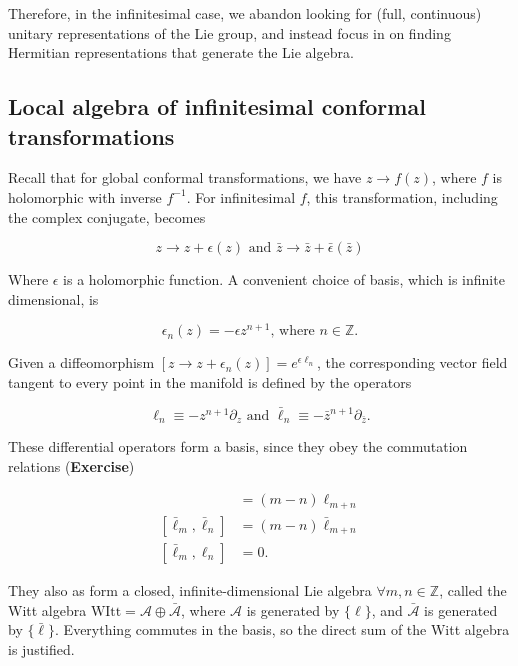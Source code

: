 \noindent Therefore, in the infinitesimal case, we abandon looking for (full, continuous) unitary representations of the Lie group, and instead focus in on finding Hermitian representations that generate the Lie algebra. \\

\subsection*{Local algebra of infinitesimal conformal transformations}

\noindent Recall that for global conformal transformations, we have $z \rightarrow f(z)$, where $f$ is holomorphic with inverse $f^{-1}$. For infinitesimal $f$, this transformation, including the complex conjugate, becomes

\begin{equation}
z \rightarrow z + \epsilon (z) \text{ and } \bar{z} \rightarrow \bar{z} + \bar{\epsilon}(\bar{z})
\end{equation}

\noindent Where $\epsilon$ is a holomorphic function. A convenient choice of basis, which is infinite dimensional, is

\begin{equation}
\epsilon_n (z) = -\epsilon z^{n+1} \text{, where } n \in \mathbb{Z}.
\end{equation}

\noindent Given a diffeomorphism $[z \rightarrow z + \epsilon_n (z)] = e^{\epsilon \ell_n}$, the corresponding vector field tangent to every point in the manifold is defined by the operators

\begin{equation}
\ell_n \equiv - z^{n+1} \partial_z \text{ and } \bar{\ell}_n \equiv - \bar{z}^{n+1} \partial_{\bar{z}}.
\end{equation}

\noindent These differential operators form a basis, since they obey the commutation relations (\textbf{Exercise})

\begin{align}
[ \ell_m , \ell_n ] &= (m-n) \ell_{m+n} \\
[ \bar{\ell}_m, \bar{\ell}_n ] &= (m-n) \bar{\ell}_{m+n} \\
[\bar{\ell}_m , \ell_n ] &= 0.
\end{align}

\noindent They also as form a closed, infinite-dimensional Lie algebra $\forall m,n \in \mathbb{Z}$, called the Witt algebra $\text{WItt} = \mathcal{A} \oplus \bar{\mathcal{A}}$, where $\mathcal{A}$ is generated by $\{ \ell \}$, and $\bar{\mathcal{A}}$ is generated by $\{ \bar{\ell} \}$. Everything commutes in the basis, so the direct sum of the Witt algebra is justified. \\

